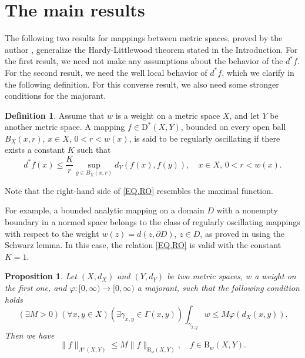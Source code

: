 \documentclass{amsart}
\newtheorem{proposition}[theorem]{Proposition}
\theoremstyle{definition}
\newtheorem{definition}[theorem]{Definition}
\numberwithin{equation}{section}
\begin{document}
\section{The main results}


The following two results for mappings between metric spaces, proved by the author \cite{MARKOVIC.JGA.2}, generalize
the Hardy-Littlewood theorem stated in the Introduction. For the first result, we need not make any assumptions about
the behavior of the $d^\ast f$. For the second result, we need the well local behavior of $d^\ast f$, which we clarify
in the following definition. For this converse result, we also need some stronger conditions for the majorant.

\begin{definition}
Assume that $w$ is a weight on a metric space $X$, and let $Y$ be another metric space. A mapping
$f\in\mathrm {D}^\ast(X,Y)$, bounded on every open ball $B_X(x,r)$, $x\in X$, $0<r<w(x)$, is said to be regularly
oscillating if there exists a constant $K$ such that
\begin{equation}\label{EQ.RO}
d^\ast f  (x)  \le  \frac  {K} r {\sup_{y\in B_X(x,r)} d_Y ( f(x),  f(y) )},\quad x\in X,\,  0<r<w(x).
\end{equation}
\end{definition}

Note that the right-hand side of \eqref{EQ.RO} resembles the maximal function.

For example, a bounded analytic mapping on a domain $D$ with a nonempty boundary in a normed space belongs to the class
of regularly oscillating mappings with respect to the weight $w(z) = d(z,\partial D)$, $z\in D$, as proved in
\cite{MARKOVIC.JGA.2} using the Schwarz lemma. In this case, the relation \eqref{EQ.RO} is valid with the constant $K=1$.

\begin{proposition}\label{PR.1}
Let $(X,d_X)$ and $(Y,d_Y)$ be two metric spaces, $w$ a weight on the first one, and $\varphi:[0,\infty)\to [0,\infty)$
a majorant, such that the following condition holds
\begin{equation}\label{EQ.COND.LAPP.VARPHI}
(\exists M>0)(\forall x,y\in X)(\exists\gamma_{x,y}\in \Gamma(x,y)) \int _{\gamma_{x,y}} w \le M \varphi (d_X (x,y)).
\end{equation}
Then we have
\begin{equation*}
\|f\| _{ \Lambda^\varphi  (X,Y)}\le   M\|f\| _{ \mathrm {B}_w (X,Y)}, \quad f\in \mathrm {B}_w (X,Y).
\end{equation*}
\end{proposition}
\end{document}
